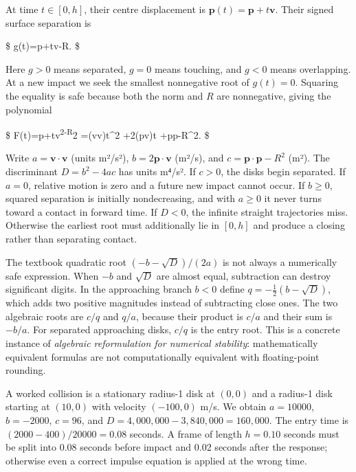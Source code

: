 At time \(t\in[0,h]\), their centre displacement is \(\mathbf p(t)=\mathbf p+t\mathbf v\). Their signed surface separation is

\$ g(t)=\textbar{}\mathbf p+t\mathbf v\textbar-R. \$

Here \(g>0\) means separated, \(g=0\) means touching, and \(g<0\) means overlapping. At a new impact we seek the smallest nonnegative root of \(g(t)=0\). Squaring the equality is safe because both the norm and \(R\) are nonnegative, giving the polynomial

\$ F(t)=\textbar{}\mathbf p+t\mathbf v\textbar{}\textsuperscript{2-R}2 =(\mathbf v\cdot\mathbf v)t\^{}2 +2(\mathbf p\cdot\mathbf v)t +\mathbf p\cdot\mathbf p-R\^{}2. \$

Write \(a=\mathbf v\cdot\mathbf v\) (units m²/s²), \(b=2\mathbf p\cdot\mathbf v\) (m²/s), and \(c=\mathbf p\cdot\mathbf p-R^2\) (m²). The discriminant \(D=b^2-4ac\) has units m⁴/s². If \(c>0\), the disks begin separated. If \(a=0\), relative motion is zero and a future new impact cannot occur. If \(b\ge0\), squared separation is initially nondecreasing, and with \(a\ge0\) it never turns toward a contact in forward time. If \(D<0\), the infinite straight trajectories miss. Otherwise the earliest root must additionally lie in \([0,h]\) and produce a closing rather than separating contact.

The textbook quadratic root \((-b-\sqrt D)/(2a)\) is not always a numerically safe expression. When \(-b\) and \(\sqrt D\) are almost equal, subtraction can destroy significant digits. In the approaching branch \(b<0\) define \(q=-\tfrac12(b-\sqrt D)\), which adds two positive magnitudes instead of subtracting close ones. The two algebraic roots are \(c/q\) and \(q/a\), because their product is \(c/a\) and their sum is \(-b/a\). For separated approaching disks, \(c/q\) is the entry root. This is a concrete instance of \emph{algebraic reformulation for numerical stability}: mathematically equivalent formulas are not computationally equivalent with floating-point rounding.

A worked collision is a stationary radius-1 disk at \((0,0)\) and a radius-1 disk starting at \((10,0)\) with velocity \((-100,0)\) m/s. We obtain \(a=10000\), \(b=-2000\), \(c=96\), and \(D=4{,}000{,}000-3{,}840{,}000=160{,}000\). The entry time is \((2000-400)/20000=0.08\) seconds. A frame of length \(h=0.10\) seconds must be split into 0.08 seconds before impact and 0.02 seconds after the response; otherwise even a correct impulse equation is applied at the wrong time.


